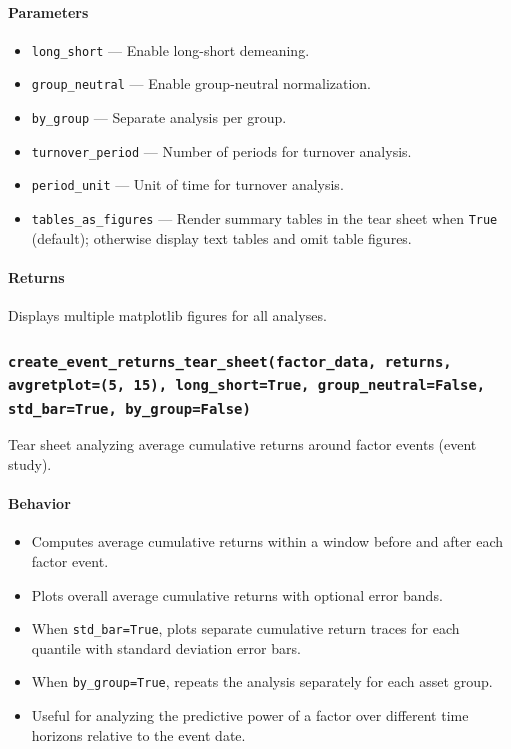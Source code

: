 \documentclass[11pt]{article}
\begin{document}
\paragraph{Parameters}
\begin{itemize}
  \item \texttt{long\_short} --- Enable long-short demeaning.
  \item \texttt{group\_neutral} --- Enable group-neutral normalization.
  \item \texttt{by\_group} --- Separate analysis per group.
  \item \texttt{turnover\_period} --- Number of periods for turnover analysis.
  \item \texttt{period\_unit} --- Unit of time for turnover analysis.
  \item \texttt{tables\_as\_figures} --- Render summary tables in the tear sheet when \texttt{True} (default); otherwise display text tables and omit table figures.
\end{itemize}

\paragraph{Returns}
Displays multiple matplotlib figures for all analyses.

\subsubsection{\texttt{create\_event\_returns\_tear\_sheet(factor\_data, returns, avgretplot=(5, 15), long\_short=True, group\_neutral=False, std\_bar=True, by\_group=False)}}
Tear sheet analyzing average cumulative returns around factor events (event study).

\paragraph{Behavior}
\begin{itemize}
  \item Computes average cumulative returns within a window before and after each factor event.
  \item Plots overall average cumulative returns with optional error bands.
  \item When \texttt{std\_bar=True}, plots separate cumulative return traces for each quantile with standard deviation error bars.
  \item When \texttt{by\_group=True}, repeats the analysis separately for each asset group.
  \item Useful for analyzing the predictive power of a factor over different time horizons relative to the event date.
\end{itemize}
\end{document}
